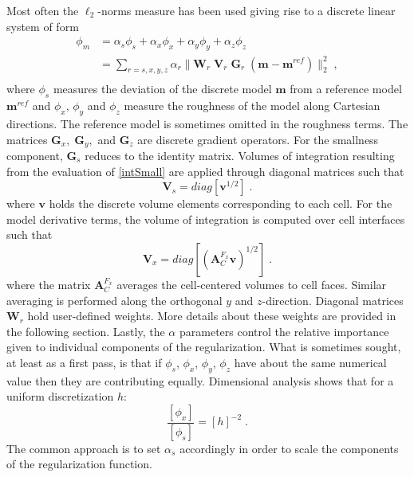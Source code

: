 Most often the $\ell_2$-norms measure has been used giving rise to a discrete linear system of form
\begin{equation}\label{leastSquaresLin}
\begin{split}
\phi_m &= \alpha_s \phi_s + \alpha_x \phi_x +\alpha_y \phi_y+\alpha_z \phi_z\\
& = \sum_{r=s,x,y,z} \alpha_r \|\mathbf{W}_r \;\mathbf{V}_r \;\mathbf{G}_r \;(\mathbf{m}-\mathbf{m}^{ref})\|_2^2 \;,\\
\end{split}
\end{equation}
where $\phi_s$ measures the deviation of the discrete model $\mathbf{m}$ from a reference model $\mathbf{m}^{ref}$ and $\phi_x$, $\phi_y$ and $\phi_z$ measure the roughness of the model along Cartesian directions. The reference model is sometimes omitted in the roughness terms. The matrices $\mathbf{G}_x,\;\mathbf{G}_y,$ and $\mathbf{G}_z$ are discrete gradient operators. 
For the smallness component, $\mathbf{G}_s$ reduces to the identity matrix. Volumes of integration resulting from the evaluation of \eqref{intSmall} are applied through diagonal matrices such that 
\begin{equation}
\mathbf{V}_s = diag\left[ \mathbf{v}^{1/2}  \right]\;.
\end{equation}
where $\mathbf{v}$ holds the discrete volume elements corresponding to each cell.
For the model derivative terms, the volume of integration is computed over cell interfaces such that
\begin{equation}\label{volumeAve}
\mathbf{V}_x = diag\left[\left( \mathbf{A}_C^{F_x} \mathbf{v}\right)^{1/2}  \right]\;.
\end{equation}
where the matrix $\mathbf{A}_C^{F_x}$ averages the cell-centered volumes to cell faces. Similar averaging is performed along the orthogonal $y$ and $z$-direction. Diagonal matrices $\mathbf{W}_r$ hold user-defined weights. More details about these weights are provided in the following section. 
Lastly, the $\alpha$ parameters control the relative importance given to individual components of the regularization.
What is sometimes sought, at least as a first pass, is that if $\phi_s$, $\phi_x$, $\phi_y$, $\phi_z$ have about the same numerical value then they are contributing equally. Dimensional analysis shows that for a uniform discretization $h$:
\begin{equation}\label{lengthScale}
\frac{[\phi_x] }{ [\phi_s]} = {[h]}^{-2}\;.
\end{equation}
The common approach is to set $\alpha_s$ accordingly in order to scale the components of the regularization function.

